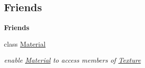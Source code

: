 \subsection*{Friends}
\begin{Indent}\textbf{ Friends}\par
\begin{DoxyCompactItemize}
\item 
\mbox{\label{classrev_1_1_texture_aa1212b6e372a0f45d2c01f3cd203af77}} 
class \mbox{\hyperlink{classrev_1_1_texture_aa1212b6e372a0f45d2c01f3cd203af77}{Material}}
\begin{DoxyCompactList}\small\item\em enable \mbox{\hyperlink{classrev_1_1_material}{Material}} to access members of \mbox{\hyperlink{classrev_1_1_texture}{Texture}} \end{DoxyCompactList}\end{DoxyCompactItemize}
\end{Indent}
